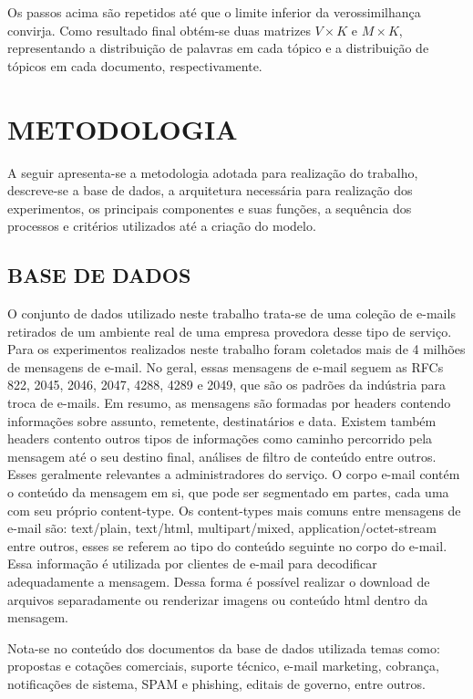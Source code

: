 \documentclass[12pt,a4paper]{article}
\begin{document}
Os passos acima são repetidos até que o limite inferior da verossimilhança convirja. Como resultado final obtém-se duas matrizes $V \times K$ e $M \times K$,
 representando  a distribuição de palavras em cada tópico e a distribuição de tópicos em cada documento, respectivamente.



\section{METODOLOGIA} \label{sec:metodologia}

A seguir apresenta-se a metodologia adotada para realização do trabalho, descreve-se a base de dados, a arquitetura necessária 
 para realização dos experimentos, os principais componentes e suas funções, a sequência dos processos e critérios utilizados até a criação do modelo.

\subsection{BASE DE DADOS} \label{sec:base-de-dados}

O conjunto de dados utilizado neste trabalho trata-se de uma coleção de e-mails retirados de um ambiente real de uma empresa provedora desse tipo de serviço. 
 Para os experimentos realizados neste trabalho foram coletados mais de 4 milhões de mensagens de e-mail. No geral, essas mensagens de e-mail seguem as RFCs 822, 2045, 2046, 2047, 4288, 4289 e 2049,
 que são os padrões da indústria para troca de e-mails.	Em resumo, as mensagens são formadas por headers contendo informações sobre assunto, remetente, destinatários e data.
 Existem também headers contento outros tipos de informações como caminho percorrido pela mensagem até o seu destino final, análises de filtro de conteúdo entre outros. Esses geralmente relevantes a administradores do serviço. O corpo e-mail contém o conteúdo da mensagem em si, que pode ser segmentado em  partes, cada uma com seu próprio content-type. 
 Os content-types mais comuns entre mensagens de e-mail são: text/plain, text/html, multipart/mixed, application/octet-stream entre outros, esses se referem ao tipo do conteúdo seguinte no corpo do e-mail.
 Essa informação é utilizada por clientes de e-mail para decodificar adequadamente a mensagem. Dessa forma é possível realizar o download de arquivos separadamente ou renderizar imagens ou conteúdo html dentro da mensagem.

Nota-se no conteúdo dos documentos da base de dados utilizada temas como: propostas e cotações comerciais, suporte técnico,
 e-mail marketing, cobrança, notificações de sistema, SPAM e phishing, editais de governo, entre outros.
\end{document}

